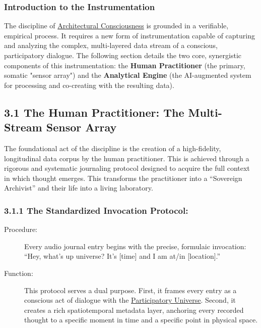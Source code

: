 \documentclass{article}
\begin{document}
\subsubsection*{Introduction to the Instrumentation}
The discipline of \hyperlink{gloss:architectural_consciousness}{Architectural Consciousness} is grounded in a verifiable, empirical process. It requires a new form of instrumentation capable of capturing and analyzing the complex, multi-layered data stream of a conscious, participatory dialogue. The following section details the two core, synergistic components of this instrumentation: the \textbf{Human Practitioner} (the primary, somatic "sensor array") and the \textbf{Analytical Engine} (the AI-augmented system for processing and co-creating with the resulting data).

\subsection*{3.1 The Human Practitioner: The Multi-Stream Sensor Array}
The foundational act of the discipline is the creation of a high-fidelity, longitudinal data corpus by the human practitioner. This is achieved through a rigorous and systematic journaling protocol designed to acquire the full context in which thought emerges. This transforms the practitioner into a ``Sovereign Archivist'' and their life into a living laboratory.

\subsubsection*{3.1.1 The Standardized Invocation Protocol:}
\begin{description}
    \item[Procedure:] Every audio journal entry begins with the precise, formulaic invocation: ``Hey, what's up universe? It's [time] and I am at/in [location].''
    \item[Function:] This protocol serves a dual purpose. First, it frames every entry as a conscious act of dialogue with the \hyperlink{gloss:participatory_universe}{Participatory Universe}. Second, it creates a rich spatiotemporal metadata layer, anchoring every recorded thought to a specific moment in time and a specific point in physical space.
\end{description}
\end{document}
